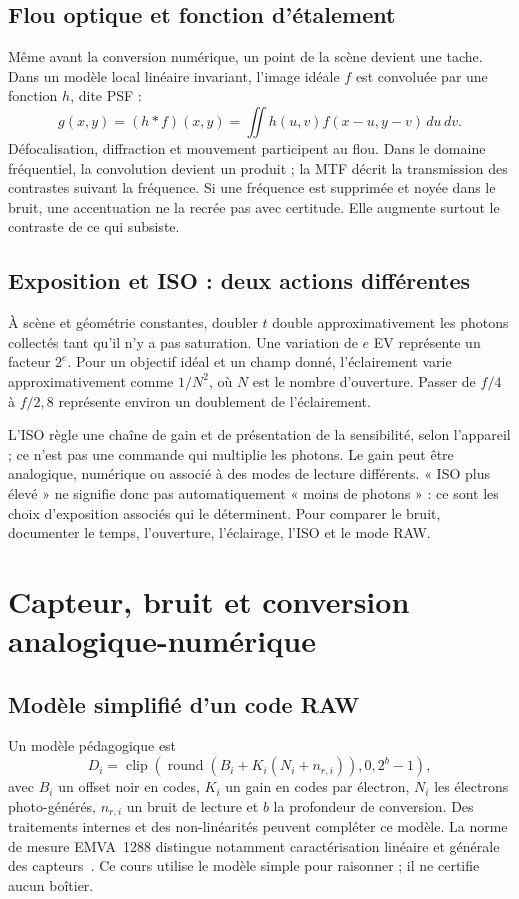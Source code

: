 \subsection{Flou optique et fonction d'étalement}
Même avant la conversion numérique, un point de la scène devient une
tache. Dans un modèle local linéaire invariant, l'image idéale $f$ est
convoluée par une fonction $h$, dite PSF :
\begin{equation}
g(x,y)=(h*f)(x,y)=\iint h(u,v)f(x-u,y-v)\,du\,dv.
\end{equation}
Défocalisation, diffraction et mouvement participent au flou. Dans
le domaine fréquentiel, la convolution devient un produit ; la MTF
décrit la transmission des contrastes suivant la fréquence. Si une
fréquence est supprimée et noyée dans le bruit, une accentuation ne
la recrée pas avec certitude. Elle augmente surtout le contraste de
ce qui subsiste.

\subsection{Exposition et ISO : deux actions différentes}
À scène et géométrie constantes, doubler $t$ double approximativement
les photons collectés tant qu'il n'y a pas saturation. Une variation
de $e$ EV représente un facteur $2^e$. Pour un objectif idéal et un
champ donné, l'éclairement varie approximativement comme $1/N^2$, où
$N$ est le nombre d'ouverture. Passer de $f/4$ à $f/2{,}8$ représente
environ un doublement de l'éclairement.

L'ISO règle une chaîne de gain et de présentation de la sensibilité,
selon l'appareil ; ce n'est pas une commande qui multiplie les photons.
Le gain peut être analogique, numérique ou associé à des modes de
lecture différents. « ISO plus élevé » ne signifie donc pas
automatiquement « moins de photons » : ce sont les choix d'exposition
associés qui le déterminent. Pour comparer le bruit, documenter le
temps, l'ouverture, l'éclairage, l'ISO et le mode RAW.

\section{Capteur, bruit et conversion analogique-numérique}
\subsection{Modèle simplifié d'un code RAW}
Un modèle pédagogique est
\begin{equation}
D_i=\operatorname{clip}\!\left(
\operatorname{round}(B_i+K_i(N_i+n_{r,i})),0,2^b-1\right),
\end{equation}
avec $B_i$ un offset noir en codes, $K_i$ un gain en codes par électron,
$N_i$ les électrons photo-générés, $n_{r,i}$ un bruit de lecture et $b$
la profondeur de conversion. Des traitements internes et des
non-linéarités peuvent compléter ce modèle. La norme de mesure
EMVA~1288 distingue notamment caractérisation linéaire et générale
des capteurs~\cite{emva}. Ce cours utilise le modèle simple pour
raisonner ; il ne certifie aucun boîtier.

